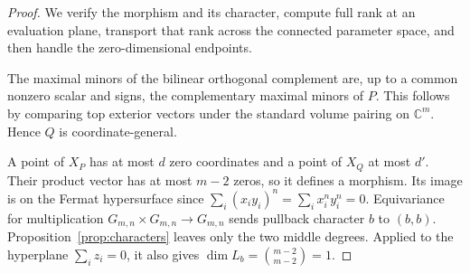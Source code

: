 \documentclass[11pt]{article}
\newcommand{\C}{\mathbb C}
\theoremstyle{plain}
\theoremstyle{definition}
\theoremstyle{remark}
\numberwithin{equation}{section}
\begin{document}
\begin{proof}
We verify the morphism and its character, compute full rank at an
evaluation plane, transport that rank across the connected parameter
space, and then handle the zero-dimensional endpoints.

The maximal minors of the bilinear orthogonal complement are, up to
a common nonzero scalar and signs, the complementary maximal minors
of \(P\).  This follows by comparing top exterior vectors under the
standard volume pairing on \(\C^m\).  Hence \(Q\) is coordinate-general.

A point of \(X_P\) has at most \(d\) zero coordinates and a point
of \(X_Q\) at most \(d'\).  Their product vector has at most
\(m-2\) zeros, so it defines a morphism.  Its image is on the
Fermat hypersurface since
\(\sum_i(x_i y_i)^n=\sum_i x_i^n y_i^n=0\).
Equivariance for multiplication
\(G_{m,n}\times G_{m,n}\to G_{m,n}\) sends pullback character
\(b\) to \((b,b)\).  Proposition~\ref{prop:characters} leaves
only the two middle degrees.  Applied to the hyperplane
\(\sum_i z_i=0\), it also gives
\(\dim L_b=\binom{m-2}{m-2}=1\).


\end{proof}
\end{document}
